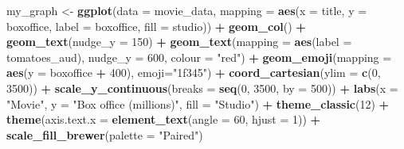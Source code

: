 \documentclass[
]{krantz}
\makeatletter
\newenvironment{Shaded}{\begin{snugshade}}{\end{snugshade}}
\newcommand{\DataTypeTok}[1]{\textcolor[rgb]{0.27,0.27,0.27}{#1}}
\newcommand{\DecValTok}[1]{\textcolor[rgb]{0.06,0.06,0.06}{#1}}
\newcommand{\KeywordTok}[1]{\textcolor[rgb]{0.27,0.27,0.27}{\textbf{#1}}}
\newcommand{\NormalTok}[1]{#1}
\newcommand{\OperatorTok}[1]{\textcolor[rgb]{0.43,0.43,0.43}{\textbf{#1}}}
\newcommand{\StringTok}[1]{\textcolor[rgb]{0.5,0.5,0.5}{#1}}
\newenvironment{kframe}{%
\medskip{}
\setlength{\fboxsep}{.8em}
 \def\at@end@of@kframe{}%
 \ifinner\ifhmode%
  \def\at@end@of@kframe{\end{minipage}}%
  \begin{minipage}{\columnwidth}%
 \fi\fi%
 \def\FrameCommand##1{\hskip\@totalleftmargin \hskip-\fboxsep
 \colorbox{shadecolor}{##1}\hskip-\fboxsep
     \hskip-\linewidth \hskip-\@totalleftmargin \hskip\columnwidth}%
 \MakeFramed {\advance\hsize-\width
   \@totalleftmargin\z@ \linewidth\hsize
   \@setminipage}}%
 {\par\unskip\endMakeFramed%
 \at@end@of@kframe}
\renewenvironment{Shaded}{\begin{kframe}}{\end{kframe}}
\makeatother
\begin{document}
\begin{Shaded}
\begin{Highlighting}[]
\NormalTok{my_graph <-}\StringTok{ }\KeywordTok{ggplot}\NormalTok{(}\DataTypeTok{data =}\NormalTok{ movie_data,}
           \DataTypeTok{mapping =} \KeywordTok{aes}\NormalTok{(}\DataTypeTok{x =}\NormalTok{ title,}
                         \DataTypeTok{y =}\NormalTok{ boxoffice,}
                         \DataTypeTok{label =}\NormalTok{ boxoffice, }
                         \DataTypeTok{fill =}\NormalTok{ studio)) }\OperatorTok{+}
\StringTok{  }\KeywordTok{geom_col}\NormalTok{() }\OperatorTok{+}
\StringTok{  }\KeywordTok{geom_text}\NormalTok{(}\DataTypeTok{nudge_y =} \DecValTok{150}\NormalTok{)  }\OperatorTok{+}
\StringTok{  }\KeywordTok{geom_text}\NormalTok{(}\DataTypeTok{mapping =} \KeywordTok{aes}\NormalTok{(}\DataTypeTok{label =}\NormalTok{ tomatoes_aud), }
            \DataTypeTok{nudge_y =} \DecValTok{600}\NormalTok{, }
            \DataTypeTok{colour =} \StringTok{"red"}\NormalTok{) }\OperatorTok{+}
\StringTok{  }\KeywordTok{geom_emoji}\NormalTok{(}\DataTypeTok{mapping =} \KeywordTok{aes}\NormalTok{(}\DataTypeTok{y =}\NormalTok{ boxoffice }\OperatorTok{+}\StringTok{ }\DecValTok{400}\NormalTok{),}
             \DataTypeTok{emoji=}\StringTok{"1f345"}\NormalTok{) }\OperatorTok{+}
\StringTok{  }\KeywordTok{coord_cartesian}\NormalTok{(}\DataTypeTok{ylim =} \KeywordTok{c}\NormalTok{(}\DecValTok{0}\NormalTok{, }\DecValTok{3500}\NormalTok{)) }\OperatorTok{+}
\StringTok{  }\KeywordTok{scale_y_continuous}\NormalTok{(}\DataTypeTok{breaks =} \KeywordTok{seq}\NormalTok{(}\DecValTok{0}\NormalTok{, }\DecValTok{3500}\NormalTok{, }\DataTypeTok{by =} \DecValTok{500}\NormalTok{)) }\OperatorTok{+}
\StringTok{  }\KeywordTok{labs}\NormalTok{(}\DataTypeTok{x =} \StringTok{"Movie"}\NormalTok{,}
       \DataTypeTok{y =} \StringTok{"Box office (millions)"}\NormalTok{,}
       \DataTypeTok{fill =} \StringTok{"Studio"}\NormalTok{) }\OperatorTok{+}
\StringTok{  }\KeywordTok{theme_classic}\NormalTok{(}\DecValTok{12}\NormalTok{) }\OperatorTok{+}
\StringTok{  }\KeywordTok{theme}\NormalTok{(}\DataTypeTok{axis.text.x =} \KeywordTok{element_text}\NormalTok{(}\DataTypeTok{angle =} \DecValTok{60}\NormalTok{, }
                                   \DataTypeTok{hjust =} \DecValTok{1}\NormalTok{)) }\OperatorTok{+}
\StringTok{  }\KeywordTok{scale_fill_brewer}\NormalTok{(}\DataTypeTok{palette =} \StringTok{"Paired"}\NormalTok{)}
\end{Highlighting}
\end{Shaded}
\end{document}
